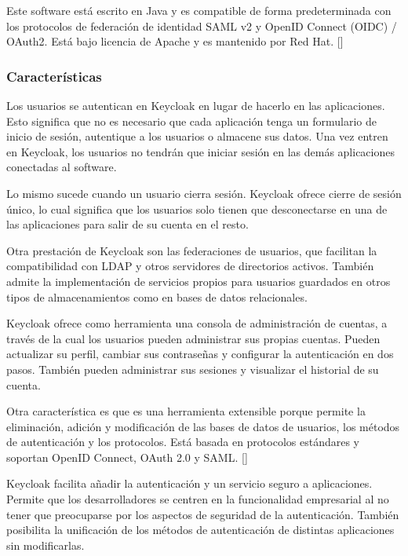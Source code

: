 Este software está escrito en Java y es compatible de forma predeterminada con los protocolos de federación de identidad SAML v2 y OpenID Connect (OIDC) / OAuth2. Está bajo licencia de Apache y es  mantenido por Red Hat. [\cite{KeycloakDoc}]

	\subsubsection{Características}
	Los usuarios se autentican en Keycloak en lugar de hacerlo en las aplicaciones. Esto significa que no es necesario que cada aplicación tenga un formulario de inicio de sesión, autentique a los usuarios o almacene sus datos. Una vez entren en Keycloak, los usuarios no tendrán que iniciar sesión en las demás aplicaciones conectadas al software.
	
	Lo mismo sucede cuando un usuario cierra sesión. Keycloak ofrece cierre de sesión único, lo cual significa que los usuarios solo tienen que desconectarse en una de las aplicaciones para salir de su cuenta en el resto. 
	
	Otra prestación de Keycloak son las federaciones de usuarios, que facilitan la compatibilidad con LDAP y otros servidores de directorios activos. También admite la implementación de servicios propios para usuarios guardados en otros tipos de almacenamientos como en bases de datos relacionales. 
	
	Keycloak ofrece como herramienta una consola de administración de cuentas, a través de la cual los usuarios pueden administrar sus propias cuentas. Pueden actualizar su perfil, cambiar sus contraseñas y configurar la autenticación en dos pasos. También pueden administrar sus sesiones y visualizar el historial de su cuenta. 
	
	Otra característica es que es una herramienta extensible porque permite la eliminación, adición y modificación de las bases de datos de usuarios, los métodos de autenticación y los protocolos. Está basada en protocolos estándares y soportan OpenID Connect, OAuth 2.0 y SAML. [\cite{KeycloakDoc}]
	
	Keycloak facilita añadir la autenticación y un servicio seguro a aplicaciones. Permite que los desarrolladores se centren en la funcionalidad empresarial al no tener que preocuparse por los aspectos de seguridad de la autenticación. También posibilita la unificación de los métodos de autenticación de distintas aplicaciones sin modificarlas.
	


